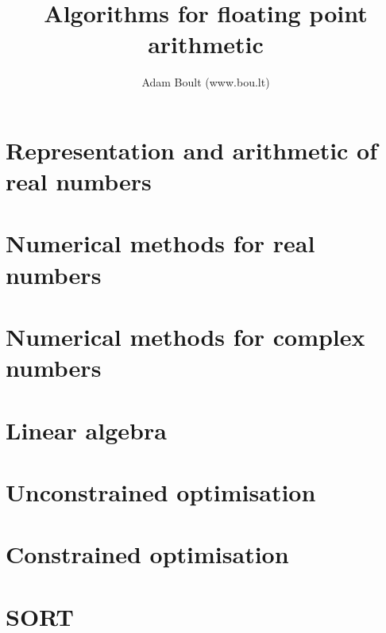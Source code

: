 \documentclass[oneside]{book}
\begin{document}
\author{Adam Boult (www.bou.lt)}
\title{Algorithms for floating point arithmetic}
\maketitle

\setcounter{tocdepth}{0}
\tableofcontents



\part{Representation and arithmetic of real numbers}



\part{Numerical methods for real numbers}







\part{Numerical methods for complex numbers}


\part{Linear algebra}









\part{Unconstrained optimisation}





\part{Constrained optimisation}


\part{SORT}

\end{document}
